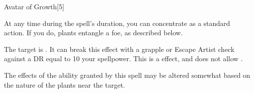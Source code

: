 \begin{spellsection}{Avatar of Growth}[5]
    \begin{spellheader}
    \end{spellheader}
    \begin{spellcontent}
        \begin{spelltargetinginfo}
        \end{spelltargetinginfo}
        \begin{spelleffects}
            \spelleffect At any time during the spell's duration, you can concentrate as a standard action. If you do, plants entangle a foe, as described below.
            \spelldur \durlong
        \end{spelleffects}
    \end{spellcontent}
    \begin{spellsubcontent}
        \begin{spelltargetinginfo}
        \end{spelltargetinginfo}
        \begin{spelleffects}
            \spelleffect The target is \entangled.
            It can break this effect with a grapple or Escape Artist check against a DR equal to 10 \add your spellpower.
            This is a  effect, and does not allow .
            \spelldur \durbrief
        \end{spelleffects}
    \end{spellsubcontent}
    \begin{spellfooter}
        \spellnotes The effects of the ability granted by this spell may be altered somewhat based on the nature of the plants near the target.
        \miscastexplode
    \end{spellfooter}
    \begin{spellaugments}
    \end{spellaugments}
\end{spellsection}

